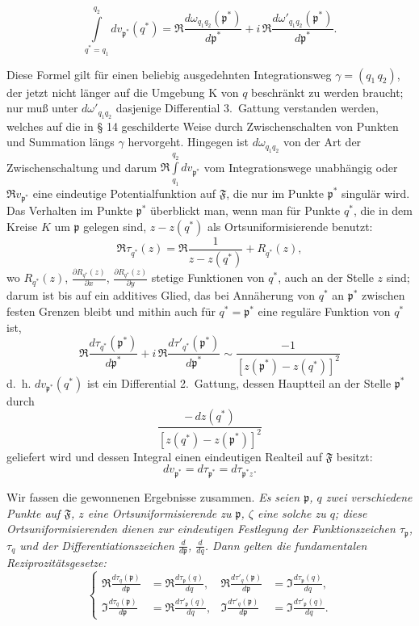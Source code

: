 \documentclass{article}
\begin{document}
\[ \int\limits_{q^* = q_1}^{q_2} dv_{\mathfrak{p}^*}(q^*) = \Re \frac{d\omega_{q_1 q_2}(\mathfrak{p}^*)}{d\mathfrak{p}^*} + i\,\Re \frac{d\omega'_{q_1 q_2}(\mathfrak{p}^*)}{d\mathfrak{p}^*}. \]

Diese Formel gilt für einen beliebig ausgedehnten Integrationsweg $\gamma = (q_1\,q_2)$, der jetzt nicht länger auf die Umgebung $\mathrm{K}$ von $q$ beschränkt zu werden braucht; nur muß unter $d\omega'_{q_1 q_2}$ dasjenige Differential 3.\ Gattung verstanden werden, welches auf die in § 14 geschilderte Weise durch Zwischenschalten von Punkten und Summation längs $\gamma$ hervorgeht. Hingegen ist $d\omega_{q_1 q_2}$ von der Art der Zwischenschaltung und darum $\Re \displaystyle\int\limits_{q_1}^{q_2} dv_{\mathfrak{p}^*}$ vom Integrationswege unabhängig oder $\Re v_{\mathfrak{p}^*}$ eine eindeutige Potentialfunktion auf $\mathfrak{F}$, die nur im Punkte $\mathfrak{p}^*$ singulär wird. Das Verhalten im Punkte $\mathfrak{p}^*$ überblickt man, wenn man für Punkte $q^*$, die in dem Kreise $K$ um $\mathfrak{p}$ gelegen sind, $z - z(q^*)$ als Ortsuniformisierende benutzt:
\[ \Re\tau_{q^*}(z) = \Re \frac{1}{z - z(q^*)} + R_{q^*}(z), \]
wo $R_{q^*}(z)$, $\frac{\partial R_{q^*}(z)}{\partial x}$, $\frac{\partial R_{q^*}(z)}{\partial y}$ stetige Funktionen von $q^*$, auch an der Stelle $z$ sind; darum ist bis auf ein additives Glied, das bei Annäherung von $q^*$ an $\mathfrak{p}^*$ zwischen festen Grenzen bleibt und mithin auch für $q^* = \mathfrak{p}^*$ eine reguläre Funktion von $q^*$ ist,
\[ \Re \frac{d\tau_{q^*}(\mathfrak{p}^*)}{d\mathfrak{p}^*} + i\,\Re \frac{d\tau'_{q^*}(\mathfrak{p}^*)}{d\mathfrak{p}^*} \sim \frac{-1}{[z(\mathfrak{p}^*) - z(q^*)]^2} \]
d.~h. $dv_{\mathfrak{p}^*}(q^*)$ ist ein Differential 2.\ Gattung, dessen Hauptteil an der Stelle $\mathfrak{p}^*$ durch
\[ \frac{-\,dz(q^*)}{[z(q^*) - z(\mathfrak{p}^*)]^2} \]
geliefert wird und dessen Integral einen eindeutigen Realteil auf $\mathfrak{F}$ besitzt:
\[ dv_{\mathfrak{p}^*} = d\tau_{\mathfrak{p}^*} = d\tau_{\mathfrak{p}^* z}. \]

Wir fassen die gewonnenen Ergebnisse zusammen. \emph{Es seien $\mathfrak{p}$, $q$ zwei verschiedene Punkte auf $\mathfrak{F}$, $z$ eine Ortsuniformisierende zu $\mathfrak{p}$, $\zeta$ eine solche zu $q$; diese Ortsuniformisierenden dienen zur eindeutigen Festlegung der Funktionszeichen $\tau_\mathfrak{p}$, $\tau_q$ und der Differentiationszeichen $\frac{d}{d\mathfrak{p}}$, $\frac{d}{dq}$. Dann gelten die fundamentalen Reziprozitätsgesetze:}
\[ \left\{ \begin{aligned}
\Re \frac{d\tau_q(\mathfrak{p})}{d\mathfrak{p}} &= \Re \frac{d\tau_\mathfrak{p}(q)}{dq}, & \Re \frac{d\tau'_q(\mathfrak{p})}{d\mathfrak{p}} &= \Im \frac{d\tau_\mathfrak{p}(q)}{dq}, \\
\Im \frac{d\tau_q(\mathfrak{p})}{d\mathfrak{p}} &= \Re \frac{d\tau'_\mathfrak{p}(q)}{dq}, & \Im \frac{d\tau'_q(\mathfrak{p})}{d\mathfrak{p}} &= \Im \frac{d\tau'_\mathfrak{p}(q)}{dq}.
\end{aligned} \right. \tag{I} \]
\end{document}
